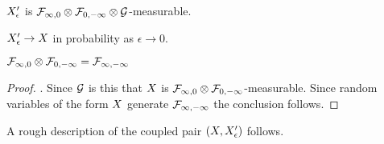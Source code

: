{\begin{obs}
  $X'_{\epsilon}$ is $\mathcal{F}_{\infty,0} \otimes \mathcal{F}_{0,-\infty} \otimes \mathcal{G}$-measurable.
\end{obs}

\begin{lemma}
  $X'_{\epsilon} \to X$ in probability as $\epsilon \to 0$.
\end{lemma}

\begin{theorem}
  $\mathcal{F}_{\infty,0} \otimes \mathcal{F}_{0,-\infty} = \mathcal{F}_{\infty,-\infty}$
\end{theorem}

\begin{proof}
  .
  Since $\mathcal{G}$ is
 this  that $X$ is $\mathcal{F}_{\infty,0} \otimes \mathcal{F}_{0,-\infty}$-measurable.
Since random variables of the form $X$ generate
$\mathcal{F}_{\infty,-\infty}$ the conclusion follows.
\end{proof}

\begin{obs}
  A rough description of the coupled pair $(X, X'_{\epsilon})$
  follows.

  \FIXME{}{}
\end{obs}
}
